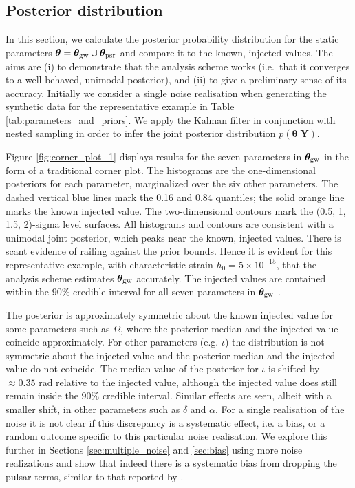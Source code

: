 \documentclass[fleqn,usenatbib,useAMS]{mnras}
\begin{document}
	
	\subsection{Posterior distribution}\label{sec:parameter_estim}
	In this section, we calculate the posterior probability distribution for the static parameters $\boldsymbol{\theta} = \boldsymbol{\theta}_{\rm gw} \cup \boldsymbol{\theta}_{\rm psr}$ and compare it to the known, injected values. The aims are (i) to demonstrate that the analysis scheme works (i.e.\ that it converges to a well-behaved, unimodal posterior), and (ii) to give a preliminary sense of its accuracy. Initially we consider a single noise realisation when generating the synthetic data for the representative example in Table \ref{tab:parameters_and_priors}. We apply the Kalman filter in conjunction with nested sampling in order to infer the joint posterior distribution $p({\boldsymbol{\theta}} | {\boldsymbol{Y}})$. \newline 
	
Figure \ref{fig:corner_plot_1} displays results for the seven parameters in  $\boldsymbol{\theta}_{\rm gw}$ in the form of a traditional corner plot. The histograms are the one-dimensional posteriors for each parameter, marginalized over the six other parameters. The dashed vertical blue lines mark the 0.16 and 0.84 quantiles; the solid orange line marks the known injected value. The two-dimensional contours mark the (0.5, 1, 1.5, 2)-sigma level surfaces. All histograms and contours are consistent with a unimodal joint posterior, which peaks near the known, injected values. There is scant evidence of railing against the prior bounds. Hence it is evident for this representative example, with characteristic strain $h_0 = 5 \times 10^{-15}$, that the analysis scheme estimates $\boldsymbol{\theta}_{\rm gw}$ accurately. The injected values are contained within the 90\% credible interval for all seven parameters in $\boldsymbol{\theta}_{\rm gw}$ . \newline 
 
 
The posterior is approximately symmetric about the known injected value for some parameters such as $\Omega$, where the posterior median and the injected value coincide approximately. For other parameters (e.g. $\iota$) the distribution is not symmetric about the injected value and the posterior median and the injected value do not coincide. The median value of the posterior for $\iota$ is shifted by $\approx 0.35$ rad relative to the injected value, although the injected value does still remain inside the 90\% credible interval. Similar effects are seen, albeit with a smaller shift, in other parameters such as $\delta$ and $\alpha$. For a single realisation of the noise it is not clear if this discrepancy is a systematic effect, i.e. a bias, or a random outcome specific to this particular noise realisation. We explore this further in Sections \ref{sec:multiple_noise} and \ref{sec:bias} using more noise realizations and show that indeed there is a systematic bias from dropping the pulsar terms, similar to that reported by \cite{Zhupulsarterms}. \newline 
\end{document}
